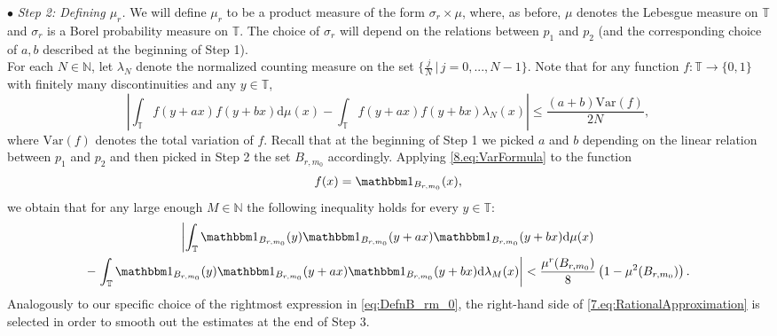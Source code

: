 \documentclass[11pt,american,preprint]{elsarticle}
\numberwithin{equation}{section}
\theoremstyle{plain}
\theoremstyle{plain*}
\theoremstyle{plain}
\theoremstyle{plain*}
\theoremstyle{plain}
\theoremstyle{plain*}
\theoremstyle{remark}
\theoremstyle{remark*}
\theoremstyle{remark}
\theoremstyle{remark*}
\theoremstyle{remark}
\theoremstyle{remark*}
\theoremstyle{plain}
\theoremstyle{definition}
\theoremstyle{plain}
\theoremstyle{plain} %
\newcommand{\N}{\mathbb{N}}
\begin{document}
$\bullet$ \textit{ Step 2: Defining $\mu_r$.}  We will define $\mu_r$ to be a product measure of the form $\sigma_r\times\mu$, where, as before, $\mu$ denotes the Lebesgue measure on $\mathbb T$ and  $\sigma_r$ is a Borel probability measure on $\mathbb T$. The choice of $\sigma_r$ will depend on the relations between  $p_1$ and $p_2$ (and the corresponding choice of $a,b$ described at the beginning of Step 1).\\
For each $N\in\N$, let $\lambda_N$ denote the normalized counting measure on the set $\{\frac{j}{N}\,|\,j=0,...,N-1\}$. 
Note that for any function $f:\mathbb T\rightarrow \{0,1\}$ with finitely many discontinuities and any $y\in\mathbb T$,
\begin{equation}\label{8.eq:VarFormula}
|\int_\mathbb T f(y+ax)f(y+bx)\text{d}\mu(x)-\int_\mathbb T f(y+ax)f(y+bx)\lambda_N(x)|\leq \frac{(a+b)\text{Var}(f)}{2N},
\end{equation}
where $\text{Var}(f)$ denotes the total variation of $f$. Recall that at the beginning of Step 1 we picked $a$ and $b$ depending on  the linear  relation between $p_1$ and $p_2$ and then picked in Step 2 the set $B_{r,m_0}$ accordingly. Applying  \eqref{8.eq:VarFormula} to the function 
$$f(x)=\mathbbm 1_{B_{r,m_0}}(x),$$
we obtain that   for any large enough  $M\in\N$ the following inequality holds for  every $y\in \mathbb T$:
\begin{multline}\label{7.eq:RationalApproximation}
    \left|\int_{\mathbb T}\mathbbm 1_{B_{r,m_0}}(y)\mathbbm 1_{B_{r,m_0}}(y+ax)\mathbbm 1_{B_{r,m_0}}(y+bx)\text{d}\mu(x)\right.\\
    -\left.\int_{\mathbb T}\mathbbm 1_{B_{r,m_0}}(y)\mathbbm 1_{B_{r,m_0}}(y+ax)\mathbbm 1_{B_{r,m_0}}(y+bx)\text{d}\lambda_M(x)\right|<\frac{\mu^r(B_{r,m_0})}{8}\left(1-\mu^2(B_{r,m_0})\right).
\end{multline}
Analogously to our specific choice of the rightmost expression  in \eqref{eq:DefnB_rm_0}, the right-hand side of \eqref{7.eq:RationalApproximation} is selected in order to smooth out the estimates at the end of  Step 3.\\
\end{document}
